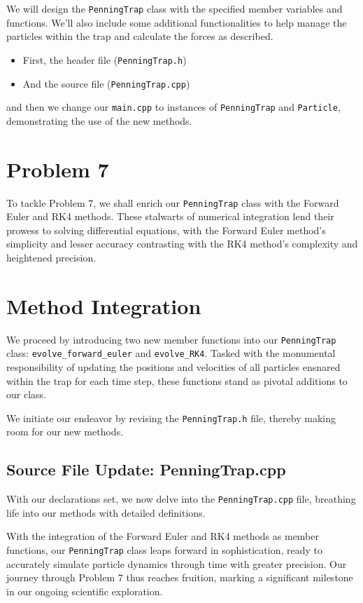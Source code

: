 \documentclass{article}
\begin{document}
\noindent We will design the \texttt{PenningTrap} class with the specified member variables and functions. We'll also include some additional functionalities to help manage the particles within the trap and calculate the forces as described.

\begin{itemize}
    \item First, the header file (\texttt{PenningTrap.h})
    \item And the source file (\texttt{PenningTrap.cpp})
\end{itemize}

\noindent and then we change our \texttt{main.cpp} to instances of \texttt{PenningTrap} and \texttt{Particle}, demonstrating the use of the new methods.


\section{Problem 7}

To tackle Problem 7, we shall enrich our \texttt{PenningTrap} class with the Forward Euler and RK4 methods. These stalwarts of numerical integration lend their prowess to solving differential equations, with the Forward Euler method's simplicity and lesser accuracy contrasting with the RK4 method's complexity and heightened precision.

\section*{Method Integration}
We proceed by introducing two new member functions into our \texttt{PenningTrap} class: \texttt{evolve\_forward\_euler} and \texttt{evolve\_RK4}. Tasked with the monumental responsibility of updating the positions and velocities of all particles ensnared within the trap for each time step, these functions stand as pivotal additions to our class.


We initiate our endeavor by revising the \texttt{PenningTrap.h} file, thereby making room for our new methods.


\subsection*{Source File Update: PenningTrap.cpp}
With our declarations set, we now delve into the \texttt{PenningTrap.cpp} file, breathing life into our methods with detailed definitions.

With the integration of the Forward Euler and RK4 methods as member functions, our \texttt{PenningTrap} class leaps forward in sophistication, ready to accurately simulate particle dynamics through time with greater precision. Our journey through Problem 7 thus reaches fruition, marking a significant milestone in our ongoing scientific exploration.
\end{document}
